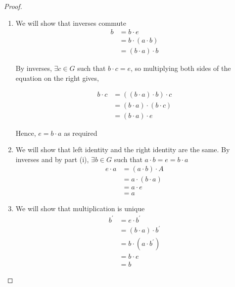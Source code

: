 \documentclass{article}
\begin{document}
\begin{proof}\leavevmode
    \begin{enumerate}
        \item We will show that inverses commute
        \begin{align*}
            b &= b \cdot e \tag{identity} \\
            &= b \cdot (a \cdot b) \tag{hypothesis} \\
            &= (b \cdot a) \cdot b \tag{associativity}
        \end{align*}

        By inverses, $\exists c \in G$ such that $b \cdot c = e$, so multiplying both sides of the equation on the right gives,

        \begin{align*}
            b \cdot c &= ((b \cdot a) \cdot b) \cdot c \\
            &= (b \cdot a) \cdot (b \cdot c) \tag{associativity} \\
            &= (b \cdot a) \cdot e \tag{identity}
        \end{align*}

        Hence, $e = b \cdot a$ as required
        
        \item We will show that left identity and the right identity are the same. By inverses and by part (i), $\exists b \in G$ such that $a \cdot b = e = b \cdot a$ 
        \begin{align*}
            e \cdot a &= (a \cdot b) \cdot A \\
            &= a \cdot (b \cdot a) \tag{associativity}\\
            &= a \cdot e \\
            &= a \tag{identity}
        \end{align*}

        \item We will show that multiplication is unique 
        \begin{align*}
            b^{\prime} &= e \cdot b^{\prime} \tag{ii}\\
            &= (b \cdot a) \cdot b^{\prime} \tag{i}\\
            &= b \cdot (a \cdot b^{\prime}) \tag{associativity}\\
            &= b \cdot e \tag{hypothesis} \\
            &= b \tag{identity}
        \end{align*}


\end{enumerate}
\end{proof}
\end{document}
